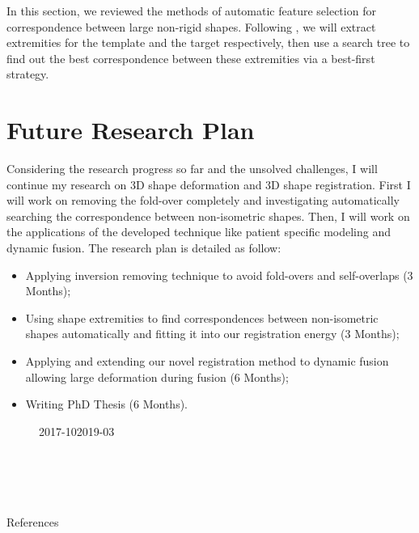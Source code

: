 In this section, we reviewed the methods of automatic feature selection for correspondence between large non-rigid shapes. Following \citep{zhang2008deformation}, we will extract extremities for the template and the target respectively, then use a search tree to find out the best correspondence between these extremities via a best-first strategy.


\section{Future Research Plan}
Considering the research progress so far and the unsolved challenges, I will continue my research on 3D shape deformation and 3D shape registration. First I will work on removing the fold-over completely and investigating automatically searching the correspondence between non-isometric shapes. Then, I will work on the applications of the developed technique like patient specific modeling and dynamic fusion. The research plan is detailed as follow:
\begin{itemize}
\item Applying inversion removing technique to avoid fold-overs and self-overlaps (3 Months);
\item Using shape extremities to find correspondences between non-isometric shapes automatically and fitting it into our registration energy (3 Months);
\item Applying and extending our novel registration method to dynamic fusion allowing large deformation during fusion (6 Months);
\item Writing PhD Thesis (6 Months).
\end{itemize}

\begin{figure}[!htb]
\begin{ganttchart}[
	hgrid,
	vgrid,
    time slot format={isodate-yearmonth},
	compress calendar
	]{2017-10}{2019-03}
	 \\
	 \\
	 \\
	 \\
	 \\
\end{ganttchart}
\end{figure}


\ifx\isEmbedded\undefined
 References
\pagebreak

\fi
